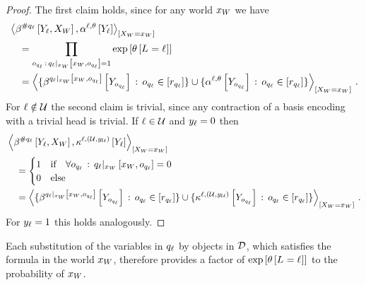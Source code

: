 \begin{proof}
    The first claim holds, since for any world $x_{W}$ we have
    \begin{align*}
        &\contractionof{\bencodingofat{\countquantifier\enumfolformula}{\headvariableof{\selindex},\worldvariables},\softactlegwith}{\indexedworldvariables} \\
        &\quad = \prod_{\indindexof{\enumfolformula}\wcols\groundingofat{\enumfolformula}{\worldindices,\indindexof{\enumfolformula}}=1} \expof{\indexedcanparam} \\
        &\quad = \contractionof{
            \{\bencodingofat{\groundingofat{\enumfolformula}{\worldindices,\indindexof{\enumfolformula}}}{\headvariableof{\indindexof{\enumfolformula}}} \wcols \indindexofin{\enumfolformula}\}
            \cup
            \{\softactlegat{\headvariableof{\indindexof{\enumfolformula}}} \wcols \indindexofin{\enumfolformula}\}
        }{\indexedworldvariables} \, .
    \end{align*}
    For $\ell\notin\mathcal{U}$ the second claim is trivial, since any contraction of a basis encoding with a trivial head is trivial.
    If $\ell\in\mathcal{U}$ and $y_{\ell}=0$ then
    \begin{align*}
        &\contractionof{\bencodingofat{\countquantifier\enumfolformula}{\headvariableof{\selindex},\worldvariables},\kcoreofat{\selindex,\hardparam}{\headvariableof{\selindex}}}{\indexedworldvariables} \\
        &\quad=
        \begin{cases}
            1 & \ifspace \forall \indindexof{\enumfolformula} \defcols  \groundingofat{\enumfolformula}{\worldindices,\indindexof{\enumfolformula}} = 0\\
            0 & \text{else}
        \end{cases} \\
        &\quad= \contractionof{
            \{\bencodingofat{\groundingofat{\enumfolformula}{\worldindices,\indindexof{\enumfolformula}}}{\headvariableof{\indindexof{\enumfolformula}}} \wcols \indindexofin{\enumfolformula}\}
            \cup
            \{\kcoreofat{\selindex,\hardparam}{\headvariableof{\indindexof{\enumfolformula}}} \wcols \indindexofin{\enumfolformula}\}
        }{\indexedworldvariables} \, .
    \end{align*}
    For $y_{\ell}=1$ this holds analogously.
\end{proof}

Each substitution of the variables in $q_{\ell}$ by objects in $\mathcal{D}$, which satisfies the formula in the world $x_{W}$, therefore provides a factor of $\mathrm{exp}\left[\theta\left[L_{}=\ell_{}\right]\right]$ to the probability of $x_{W}$.







